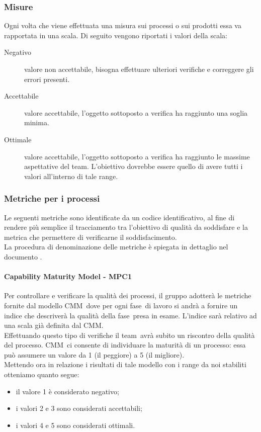 \documentclass[../PianoDiQualifica.tex]{subfiles}
\begin{document}
			\subsubsection{Misure}
			Ogni volta che viene effettuata una misura sui processi o sui prodotti essa va rapportata in una scala. Di seguito vengono riportati i valori della scala:
			\begin{description}
			\item[Negativo] valore non accettabile, bisogna effettuare ulteriori verifiche e correggere gli errori presenti.
			\item[Accettabile] valore accettabile, l'oggetto sottoposto a verifica ha raggiunto una soglia minima.
			\item[Ottimale] valore accettabile, l'oggetto sottoposto a verifica ha raggiunto le massime aspettative del team\g. L'obiettivo dovrebbe essere quello di avere tutti i valori all'interno di tale range. 
			\end{description}
			
			\subsubsection{Metriche per i processi}
			Le seguenti metriche sono identificate da un codice identificativo, al fine di rendere più semplice il tracciamento tra l'obiettivo di qualità da soddisfare e la metrica che permettere di verificarne il soddisfacimento.\\
			La procedura di denominazione delle metriche è spiegata in dettaglio nel documento \normediprogettov.
			
			\paragraph{Capability Maturity Model - MPC1}\label{MPC1}
			Per controllare e verificare la qualità dei processi, il gruppo adotterà le metriche fornite dal modello CMM\g\ dove per ogni fase\g\ di lavoro si andrà a fornire un indice che descriverà la qualità della fase\g\ presa in esame. L'indice sarà relativo ad una scala già definita dal CMM\g.\\
			Effettuando questo tipo di verifiche il team\g\ avrà subito un riscontro della qualità del processo\g. CMM\g\ ci consente di individuare la maturità di un processo\g: essa può assumere un valore da 1 (il
			peggiore) a 5 (il migliore).\\
			Mettendo ora in relazione i risultati di tale modello con i range da noi stabiliti otteniamo quanto segue:
			\begin{itemize}
				\item il valore 1 è considerato negativo;
				\item i valori 2 e 3 sono considerati accettabili;
				\item i valori 4 e 5 sono considerati ottimali.
			\end{itemize}
			
\end{document}
